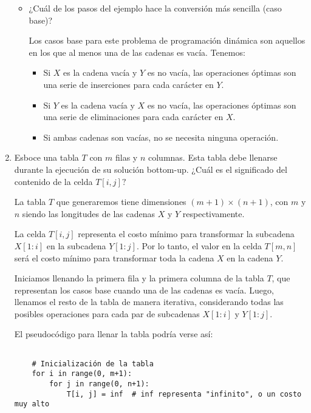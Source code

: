 \begin{problema}
\begin{enumerate}
\begin{sol}
\begin{itemize}
\begin{itemize}
            \end{itemize}
            
            \item ¿Cuál de los pasos del ejemplo hace la conversión más sencilla (caso base)?
         
            Los casos base para este problema de programación dinámica son aquellos en los que al menos una de las cadenas es vacía. Tenemos: 
            \begin{itemize}
                \item Si $X$ es la cadena vacía y $Y$ es no vacía, las operaciones óptimas son una serie de inserciones para cada carácter en $Y$.
                \item Si $Y$ es la cadena vacía y $X$ es no vacía, las operaciones óptimas son una serie de eliminaciones para cada carácter en $X$.
                \item Si ambas cadenas son vacías, no se necesita ninguna operación.
            \end{itemize}
        \end{itemize}
    \end{sol}
    \item Esboce una tabla $T$ con $m$ filas y $n$ columnas. Esta tabla debe llenarse durante la ejecución de su solución bottom-up. ¿Cuál es el significado del contenido de la celda $T[i, j] ?$
    \begin{sol}
        La tabla $T$ que generaremos tiene dimensiones $(m+1) \times (n+1)$, con $m$ y $n$ siendo las longitudes de las cadenas $X$ y $Y$ respectivamente. 

La celda $T[i, j]$ representa el costo mínimo para transformar la subcadena $X[1:i]$ en la subcadena $Y[1:j]$. Por lo tanto, el valor en la celda $T[m, n]$ será el costo mínimo para transformar toda la cadena $X$ en la cadena $Y$.

Iniciamos llenando la primera fila y la primera columna de la tabla $T$, que representan los casos base cuando una de las cadenas es vacía. Luego, llenamos el resto de la tabla de manera iterativa, considerando todas las posibles operaciones para cada par de subcadenas $X[1:i]$ y $Y[1:j]$.

El pseudocódigo para llenar la tabla podría verse así:

\begin{verbatim}

    # Inicialización de la tabla
    for i in range(0, m+1):
        for j in range(0, n+1):
            T[i, j] = inf  # inf representa "infinito", o un costo muy alto
    

\end{verbatim}
\end{sol}
\end{enumerate}
\end{problema}
